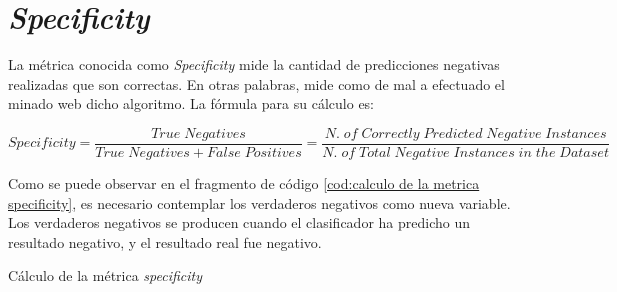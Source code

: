 \section{\emph{Specificity}}
\label{sec:specificity}

La métrica conocida como \emph{Specificity} mide la cantidad de predicciones negativas realizadas que son
correctas. En otras palabras, mide como de mal a efectuado el minado web dicho algoritmo. La fórmula para
su cálculo es:

\begin{equation*}
    Specificity = \frac{True\;Negatives}{True\;Negatives + False\;Positives} = 
    \frac{N.\;of\;Correctly\;Predicted\;Negative\;Instances}{N.\;of\;Total\;Negative\;Instances\;in\;the\;Dataset}
\end{equation*}

Como se puede observar en el fragmento de código \ref{cod:calculo de la metrica specificity}, es necesario
contemplar los verdaderos negativos como nueva variable. Los verdaderos negativos se producen cuando el 
clasificador ha predicho un resultado negativo, y el resultado real fue negativo.

\begin{codefloat}
    
    \caption{Cálculo de la métrica \emph{specificity}}
    \label{cod:calculo de la metrica specificity}
\end{codefloat}